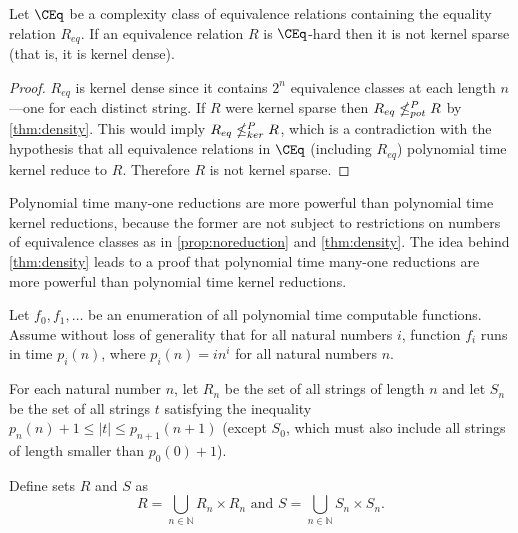 \begin{corollary}
  Let $\CEq$ be a complexity class of equivalence relations containing the equality relation $R_{eq}$.
  If an equivalence relation $R$ is $\CEq$-hard then it is not kernel sparse (that is, it is kernel dense).
\end{corollary}
\begin{proof}
  $R_{eq}$ is kernel dense since it contains $2^n$ equivalence classes at each length $n$---one for each distinct string.
  If $R$ were kernel sparse then $R_{eq}\nleq^{P}_{pot} R$ by \autoref{thm:density}.
  This would imply $R_{eq}\nleq^{P}_{ker} R$, which is a contradiction with the hypothesis that all equivalence relations in $\CEq$ (including $R_{eq}$) polynomial time kernel reduce to $R$.
  Therefore $R$ is not kernel sparse.
\end{proof}

Polynomial time many-one reductions are more powerful than polynomial time kernel reductions, because the former are not subject to restrictions on numbers of equivalence classes as in \autoref{prop:noreduction} and \autoref{thm:density}.
The idea behind \autoref{thm:density} leads to a proof that polynomial time many-one reductions are more powerful than polynomial time kernel reductions.

\begin{construction}\label{con:rands}
  Let $f_0, f_1, \dotsc$ be an enumeration of all polynomial time computable functions.
  Assume without loss of generality  that for all natural numbers $i$, function $f_i$ runs in time $p_i(n)$, where $p_i(n) = i n^i$ for all natural numbers $n$.

  For each natural number $n$, let $R_n$ be the set of all strings of length $n$ and let $S_n$ be the set of all strings $t$ satisfying the inequality $p_n(n) + 1 \leq |t| \leq p_{n + 1}(n + 1)$ (except $S_0$, which must also include all strings of length smaller than $p_0(0) + 1$).

  Define sets $R$ and $S$ as
  \begin{equation*}
    R = \bigcup_{n \in \mathbb{N}} R_n \times R_n \text{ and } S = \bigcup_{n \in \mathbb{N}} S_n \times S_n.
  \end{equation*}
\end{construction}

